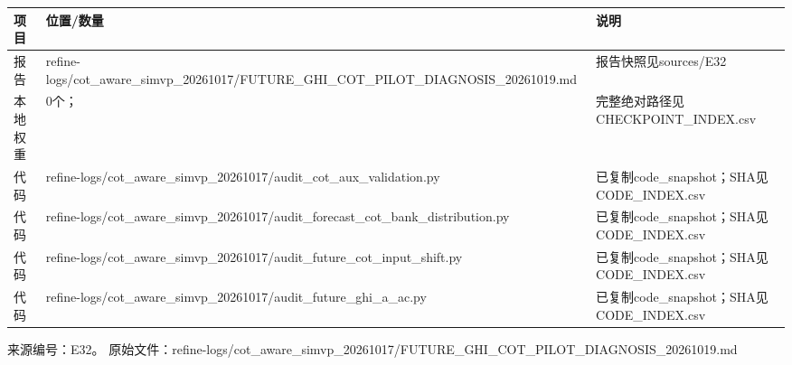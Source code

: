 \documentclass[UTF8,a4paper,landscape,10pt]{ctexart}
\begin{document}
\begin{center}\small
\begin{adjustbox}{max totalheight=0.58\textheight,max width=\linewidth}
\begin{minipage}{\linewidth}\begin{tabularx}{\linewidth}{>{\hsize=0.3500\hsize\raggedright\arraybackslash}X>{\hsize=1.9000\hsize\raggedright\arraybackslash}X>{\hsize=0.7500\hsize\raggedright\arraybackslash}X}\toprule
\textbf{项目} & \textbf{位置/\allowbreak{}数量} & \textbf{说明} \\ \midrule
报告 & refine-logs/\allowbreak{}cot\_\allowbreak{}aware\_\allowbreak{}simvp\_\allowbreak{}20261017/\allowbreak{}FUTURE\_\allowbreak{}GHI\_\allowbreak{}COT\_\allowbreak{}PILOT\_\allowbreak{}DIAGNOSIS\_\allowbreak{}20261019.md & 报告快照见sources/\allowbreak{}E32 \\
本地权重 & 0个； & 完整绝对路径见CHECKPOINT\_\allowbreak{}INDEX.csv \\
代码 & refine-logs/\allowbreak{}cot\_\allowbreak{}aware\_\allowbreak{}simvp\_\allowbreak{}20261017/\allowbreak{}audit\_\allowbreak{}cot\_\allowbreak{}aux\_\allowbreak{}validation.py & 已复制code\_\allowbreak{}snapshot；SHA见CODE\_\allowbreak{}INDEX.csv \\
代码 & refine-logs/\allowbreak{}cot\_\allowbreak{}aware\_\allowbreak{}simvp\_\allowbreak{}20261017/\allowbreak{}audit\_\allowbreak{}forecast\_\allowbreak{}cot\_\allowbreak{}bank\_\allowbreak{}distribution.py & 已复制code\_\allowbreak{}snapshot；SHA见CODE\_\allowbreak{}INDEX.csv \\
代码 & refine-logs/\allowbreak{}cot\_\allowbreak{}aware\_\allowbreak{}simvp\_\allowbreak{}20261017/\allowbreak{}audit\_\allowbreak{}future\_\allowbreak{}cot\_\allowbreak{}input\_\allowbreak{}shift.py & 已复制code\_\allowbreak{}snapshot；SHA见CODE\_\allowbreak{}INDEX.csv \\
代码 & refine-logs/\allowbreak{}cot\_\allowbreak{}aware\_\allowbreak{}simvp\_\allowbreak{}20261017/\allowbreak{}audit\_\allowbreak{}future\_\allowbreak{}ghi\_\allowbreak{}a\_\allowbreak{}ac.py & 已复制code\_\allowbreak{}snapshot；SHA见CODE\_\allowbreak{}INDEX.csv \\
\bottomrule\end{tabularx}\end{minipage}\end{adjustbox}\end{center}
\vfill{\scriptsize\color{muted} 来源编号：E32。 原始文件：refine-logs/\allowbreak{}cot\_\allowbreak{}aware\_\allowbreak{}simvp\_\allowbreak{}20261017/\allowbreak{}FUTURE\_\allowbreak{}GHI\_\allowbreak{}COT\_\allowbreak{}PILOT\_\allowbreak{}DIAGNOSIS\_\allowbreak{}20261019.md}\par
\end{document}
